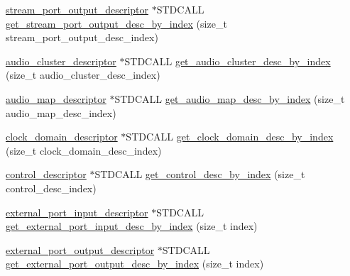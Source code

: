 \begin{DoxyCompactItemize}
\item 
\hyperlink{classavdecc__lib_1_1stream__port__output__descriptor}{stream\+\_\+port\+\_\+output\+\_\+descriptor} $\ast$S\+T\+D\+C\+A\+LL \hyperlink{classavdecc__lib_1_1configuration__descriptor__imp_a46e8e3f68289e38b50cfe72daf931cd7}{get\+\_\+stream\+\_\+port\+\_\+output\+\_\+desc\+\_\+by\+\_\+index} (size\+\_\+t stream\+\_\+port\+\_\+output\+\_\+desc\+\_\+index)
\item 
\hyperlink{classavdecc__lib_1_1audio__cluster__descriptor}{audio\+\_\+cluster\+\_\+descriptor} $\ast$S\+T\+D\+C\+A\+LL \hyperlink{classavdecc__lib_1_1configuration__descriptor__imp_a113e0f8d5a5f11102aa9259843c88878}{get\+\_\+audio\+\_\+cluster\+\_\+desc\+\_\+by\+\_\+index} (size\+\_\+t audio\+\_\+cluster\+\_\+desc\+\_\+index)
\item 
\hyperlink{classavdecc__lib_1_1audio__map__descriptor}{audio\+\_\+map\+\_\+descriptor} $\ast$S\+T\+D\+C\+A\+LL \hyperlink{classavdecc__lib_1_1configuration__descriptor__imp_affb76089a6b1c4d8700c8e13a415569e}{get\+\_\+audio\+\_\+map\+\_\+desc\+\_\+by\+\_\+index} (size\+\_\+t audio\+\_\+map\+\_\+desc\+\_\+index)
\item 
\hyperlink{classavdecc__lib_1_1clock__domain__descriptor}{clock\+\_\+domain\+\_\+descriptor} $\ast$S\+T\+D\+C\+A\+LL \hyperlink{classavdecc__lib_1_1configuration__descriptor__imp_a02a8b13cc7e1c283745be6715769e91e}{get\+\_\+clock\+\_\+domain\+\_\+desc\+\_\+by\+\_\+index} (size\+\_\+t clock\+\_\+domain\+\_\+desc\+\_\+index)
\item 
\hyperlink{classavdecc__lib_1_1control__descriptor}{control\+\_\+descriptor} $\ast$S\+T\+D\+C\+A\+LL \hyperlink{classavdecc__lib_1_1configuration__descriptor__imp_a9b2d9b6e744f01e9d6db6dd920939313}{get\+\_\+control\+\_\+desc\+\_\+by\+\_\+index} (size\+\_\+t control\+\_\+desc\+\_\+index)
\item 
\hyperlink{classavdecc__lib_1_1external__port__input__descriptor}{external\+\_\+port\+\_\+input\+\_\+descriptor} $\ast$S\+T\+D\+C\+A\+LL \hyperlink{classavdecc__lib_1_1configuration__descriptor__imp_aebf445a7e2e8177737fc06bbf57804db}{get\+\_\+external\+\_\+port\+\_\+input\+\_\+desc\+\_\+by\+\_\+index} (size\+\_\+t index)
\item 
\hyperlink{classavdecc__lib_1_1external__port__output__descriptor}{external\+\_\+port\+\_\+output\+\_\+descriptor} $\ast$S\+T\+D\+C\+A\+LL \hyperlink{classavdecc__lib_1_1configuration__descriptor__imp_a79a19e980fe9bc05842be0d02e6b633f}{get\+\_\+external\+\_\+port\+\_\+output\+\_\+desc\+\_\+by\+\_\+index} (size\+\_\+t index)
\item 

\end{DoxyCompactItemize}
